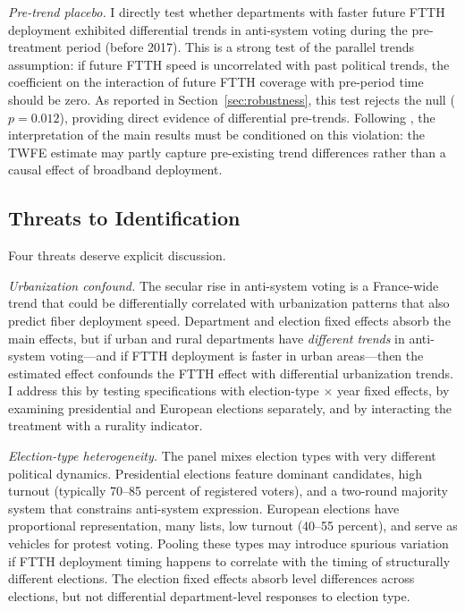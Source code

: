 \documentclass[12pt]{article}
\begin{document}
\emph{Pre-trend placebo.} I directly test whether departments with faster future FTTH deployment exhibited differential trends in anti-system voting during the pre-treatment period (before 2017). This is a strong test of the parallel trends assumption: if future FTTH speed is uncorrelated with past political trends, the coefficient on the interaction of future FTTH coverage with pre-period time should be zero. As reported in Section~\ref{sec:robustness}, this test rejects the null ($p = 0.012$), providing direct evidence of differential pre-trends. Following \citet{roth2022pretest}, the interpretation of the main results must be conditioned on this violation: the TWFE estimate may partly capture pre-existing trend differences rather than a causal effect of broadband deployment.

\subsection{Threats to Identification}

Four threats deserve explicit discussion.

\emph{Urbanization confound.} The secular rise in anti-system voting is a France-wide trend that could be differentially correlated with urbanization patterns that also predict fiber deployment speed. Department and election fixed effects absorb the main effects, but if urban and rural departments have \emph{different trends} in anti-system voting---and if FTTH deployment is faster in urban areas---then the estimated effect confounds the FTTH effect with differential urbanization trends. I address this by testing specifications with election-type $\times$ year fixed effects, by examining presidential and European elections separately, and by interacting the treatment with a rurality indicator.

\emph{Election-type heterogeneity.} The panel mixes election types with very different political dynamics. Presidential elections feature dominant candidates, high turnout (typically 70--85 percent of registered voters), and a two-round majority system that constrains anti-system expression. European elections have proportional representation, many lists, low turnout (40--55 percent), and serve as vehicles for protest voting. Pooling these types may introduce spurious variation if FTTH deployment timing happens to correlate with the timing of structurally different elections. The election fixed effects absorb level differences across elections, but not differential department-level responses to election type.
\end{document}
